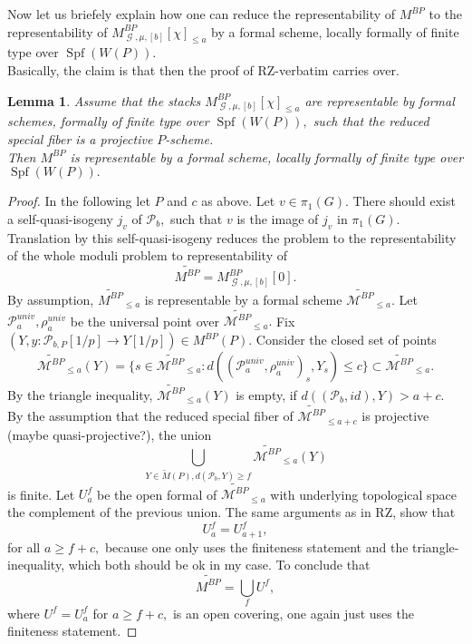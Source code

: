 \documentclass[a4paper,11,5 pt]{amsart}
\newtheorem{Lemma}[Satz]{Lemma}
\theoremstyle{definition}
\DeclareMathOperator{\Spf}{Spf}
\DeclareMathOperator{\G}{\mathcal{G}}
\begin{document}
Now let us briefely explain how one can reduce the representability of $M^{BP}$ to the representability of $M^{BP}_{\G,\mu,[b]}[\chi]_{\leq a}$ by a formal scheme, locally formally of finite type over $\Spf(W(P)).$
\\
Basically, the claim is that then the proof of RZ-verbatim carries over.
\begin{Lemma}
Assume that the stacks $
M^{BP}_{\G,\mu,[b]}[\chi]_{\leq a}$ are representable by formal schemes, formally of finite type over $\Spf(W(P)),$ such that the reduced special fiber is a projective $P$-scheme. 
\\
Then $M^{BP}$ is representable by a formal scheme, locally formally of finite type over $\Spf(W(P)).$ 
\end{Lemma}
\begin{proof}
In the following let $P$ and $c$ as above.
Let $v\in \pi_{1}(G).$ There should exist a self-quasi-isogeny $j_{v}$ of $\mathcal{P}_{b},$ such that $v$ is the image of $j_{v}$ in $\pi_{1}(G).$ Translation by this self-quasi-isogeny reduces the problem to the representability of the whole moduli problem to representability of
$$
\widetilde{M^{BP}}=
M^{BP}_{\G,\mu,[b]}[0].
$$
By assumption, $
\widetilde{M^{BP}}_{\leq a}$ is representable by a formal scheme $
\widetilde{\mathcal{M}^{BP}}_{\leq a}.$ Let $\mathcal{P}_{a}^{univ},\rho_{a}^{univ}$ be the universal point over $
\widetilde{\mathcal{M}^{BP}}_{\leq a}.$ Fix $(Y,y\colon \mathcal{P}_{b,P}[1/p]\rightarrow Y[1/p])\in M^{BP}(P).$ Consider the closed set of points
$$
\widetilde{\mathcal{M}^{BP}}_{\leq a}(Y)=\lbrace s\in 
\widetilde{\mathcal{M}^{BP}}_{\leq a}\colon d((\mathcal{P}_{a}^{univ},\rho_{a}^{univ})_{s},Y_{s})\leq c \rbrace \subset \widetilde{\mathcal{M}^{BP}}_{\leq a}.
$$
By the triangle inequality, $
\widetilde{\mathcal{M}^{BP}}_{\leq a}(Y)$ is empty, if $d((\mathcal{P}_{b},id),Y)>a+c.$ By the assumption that the reduced special fiber of $
\widetilde{\mathcal{M}^{BP}}_{\leq a+c}$ is projective (maybe quasi-projective?), the union
$$
\bigcup_{Y\in \widetilde{M}(P),d(\mathcal{P}_{b},Y)\geq f} \widetilde{\mathcal{M}^{BP}}_{\leq a}(Y)
$$
is finite. Let $U_{a}^{f}$ be the open formal of $
\widetilde{\mathcal{M}^{BP}}_{\leq a}$ with underlying topological space the complement of the previous union. The same arguments as in RZ, show that
$$
U_{a}^{f}=U_{a+1}^{f},
$$
for all $a\geq f+c,$ because one only uses the finiteness statement and the triangle-inequality, which both should be ok in my case. To conclude that
$$
\widetilde{M^{BP}}=\bigcup_{f} U^{f},
$$
where $U^{f}=U^{f}_{a}$ for $a\geq f+c,$ is an open covering, one again just uses the finiteness statement.
\end{proof}
\end{document}
